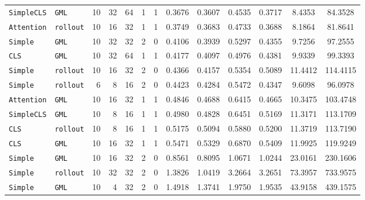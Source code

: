 \begin{table}[H]
\begin{tabular}{
l
l
r
r
r
r
r
S[table-format=1.4]
S[table-format=1.4]
S[table-format=2.4]
S[table-format=2.4]
S[table-format=3.4]
S[table-format=4.4]
}
\texttt{SimpleCLS} & \texttt{GML} & 10 & 32 & 64 & 1 & 1 & 0.3676 & 0.3607 & 0.4535 & 0.3717 & 8.4353 & 84.3528 \\
\texttt{Attention} & \texttt{rollout} & 10 & \textcolor{gray!55}{16} & \textcolor{gray!55}{32} & 1 & 1 & 0.3749 & 0.3683 & 0.4733 & 0.3688 & 8.1864 & 81.8641 \\
\texttt{Simple} & \texttt{GML} & \textcolor{gray!55}{10} & 32 & \textcolor{gray!55}{32} & \textcolor{gray!55}{2} & \textcolor{gray!55}{0} & 0.4106 & 0.3939 & 0.5297 & 0.4355 & 9.7256 & 97.2555 \\
\texttt{CLS} & \texttt{GML} & 10 & 32 & 64 & 1 & 1 & 0.4177 & 0.4097 & 0.4976 & 0.4381 & 9.9339 & 99.3393 \\
\texttt{Simple} & \texttt{rollout} & 10 & \textcolor{gray!55}{16} & \textcolor{gray!55}{32} & \textcolor{gray!55}{2} & \textcolor{gray!55}{0} & 0.4366 & 0.4157 & 0.5354 & 0.5089 & 11.4412 & 114.4115 \\
\texttt{Simple} & \texttt{rollout} & 6 & 8 & 16 & \textcolor{gray!55}{2} & \textcolor{gray!55}{0} & 0.4423 & 0.4284 & 0.5472 & 0.4347 & 9.6098 & 96.0978 \\
\texttt{Attention} & \texttt{GML} & 10 & \textcolor{gray!55}{16} & \textcolor{gray!55}{32} & 1 & 1 & 0.4846 & 0.4688 & 0.6415 & 0.4665 & 10.3475 & 103.4748 \\
\texttt{SimpleCLS} & \texttt{GML} & 10 & 8 & 16 & 1 & 1 & 0.4980 & 0.4828 & 0.6451 & 0.5169 & 11.3171 & 113.1709 \\
\texttt{CLS} & \texttt{rollout} & 10 & 8 & 16 & 1 & 1 & 0.5175 & 0.5094 & 0.5880 & 0.5200 & 11.3719 & 113.7190 \\
\texttt{CLS} & \texttt{GML} & 10 & \textcolor{gray!55}{16} & \textcolor{gray!55}{32} & 1 & 1 & 0.5471 & 0.5329 & 0.6870 & 0.5409 & 11.9925 & 119.9249 \\
\texttt{Simple} & \texttt{GML} & \textcolor{gray!55}{10} & \textcolor{gray!55}{16} & \textcolor{gray!55}{32} & \textcolor{gray!55}{2} & \textcolor{gray!55}{0} & 0.8561 & 0.8095 & 1.0671 & 1.0244 & 23.0161 & 230.1606 \\
\texttt{Simple} & \texttt{rollout} & \textcolor{gray!55}{10} & 32 & \textcolor{gray!55}{32} & \textcolor{gray!55}{2} & \textcolor{gray!55}{0} & 1.3826 & 1.0419 & 3.2664 & 3.2651 & 73.3957 & 733.9575 \\
\texttt{Simple} & \texttt{GML} & \textcolor{gray!55}{10} & 4 & \textcolor{gray!55}{32} & \textcolor{gray!55}{2} & \textcolor{gray!55}{0} & 1.4918 & 1.3741 & 1.9750 & 1.9535 & 43.9158 & 439.1575 \\

\end{tabular}
\end{table}
